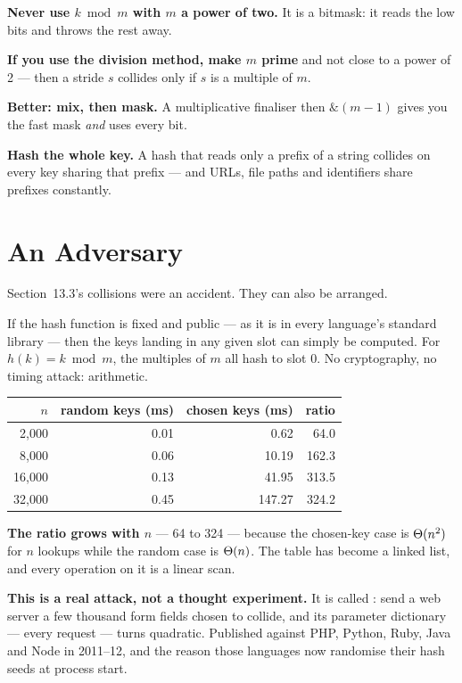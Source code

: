 \begin{conceptbox}
\begin{tight}
  \item \textbf{Never use $k \bmod m$ with $m$ a power of two.} It is a
        bitmask: it reads the low bits and throws the rest away.
  \item \textbf{If you use the division method, make $m$ prime} and not close
        to a power of 2 --- then a stride $s$ collides only if $s$ is a
        multiple of $m$.
  \item \textbf{Better: mix, then mask.} A multiplicative finaliser then
        $\&(m-1)$ gives you the fast mask \emph{and} uses every bit.
  \item \textbf{Hash the whole key.} A hash that reads only a prefix of a
        string collides on every key sharing that prefix --- and URLs, file
        paths and identifiers share prefixes constantly.
\end{tight}
\end{conceptbox}

\section{An Adversary}

Section~13.3's collisions were an accident. They can also be arranged.

\begin{worked}
If the hash function is fixed and public --- as it is in every language's
standard library --- then the keys landing in any given slot can simply be
computed. For $h(k) = k \bmod m$, the multiples of $m$ all hash to slot 0. No
cryptography, no timing attack: arithmetic.

\begin{center}
\begin{tabular}{@{}rrrr@{}}
\toprule
\rowcolor{primary!15}
$n$ & random keys (ms) & chosen keys (ms) & ratio \\
\midrule
 2{,}000 & 0.01 &   0.62 &  64.0 \\
 8{,}000 & 0.06 &  10.19 & 162.3 \\
16{,}000 & 0.13 &  41.95 & 313.5 \\
32{,}000 & 0.45 & 147{.}27 & 324.2 \\
\bottomrule
\end{tabular}
\end{center}

\smallskip
\textbf{The ratio grows with $n$} --- 64 to 324 --- because the chosen-key case
is $\Theta(n^{2})$ for $n$ lookups while the random case is $\Theta(n)$. The
table has become a linked list, and every operation on it is a linear scan.

\smallskip
\textbf{This is a real attack, not a thought experiment.} It is called
: send a web server a few thousand form fields chosen to
collide, and its parameter dictionary --- every request --- turns quadratic.
Published against PHP, Python, Ruby, Java and Node in 2011--12, and the reason
those languages now randomise their hash seeds at process start.
\end{worked}

